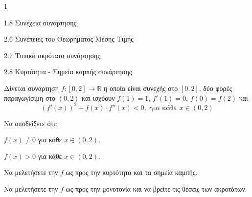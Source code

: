 \begin{ylh}{1}
    \item 1.8 Συνέχεια συνάρτησης
    \item 2.6 Συνέπειες του Θεωρήματος Μέσης Τιμής
    \item 2.7 Τοπικά ακρότατα συνάρτησης
    \item 2.8 Κυρτότητα - Σημεία καμπής συνάρτησης.
\end{ylh}
Δίνεται συνάρτηση $f : [0,2] \to \mathbb{R}$ η οποία είναι συνεχής στο $[0,2]$, δύο φορές παραγωγίσιμη στο $(0,2)$ και ισχύουν $f(1)=1$, $f'(1)=0$, $f(0)=f(2)$ και
\[ (f'(x))^2 + f(x) \cdot f''(x) < 0, \text{ για κάθε } x \in (0,2) \]
\begin{alist}
\item Να αποδείξετε ότι:
    \begin{rlist}
    \item $f(x) \neq 0$ για κάθε $x \in (0,2)$. 
    \item $f(x) > 0$ για κάθε $x \in (0,2)$. 
    \end{rlist}
\item Να μελετήσετε την $f$ ως προς την κυρτότητα και τα σημεία καμπής. 
\item Να μελετήσετε την $f$ ως προς την μονοτονία και να βρείτε τις θέσεις των ακροτάτων. 
\end{alist}